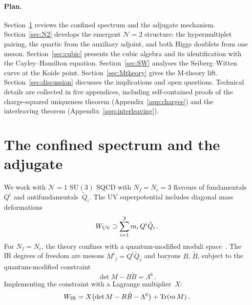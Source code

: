 \documentclass[aps,prd,twocolumn,showpacs,preprintnumbers,superscriptaddress,floatfix]{revtex4-2}
\newcommand{\SU}{\mathrm{SU}}
\newcommand{\Nf}{N_{\!f}}
\newcommand{\Nc}{N_{\!c}}
\newcommand{\Tr}{\mathrm{Tr}}
\begin{document}
\paragraph{Plan.}
Section~\ref{sec:confined} reviews the confined spectrum and the
adjugate mechanism.
Section~\ref{sec:N2} develops the emergent $\mathcal{N}{=}2$
structure: the hypermultiplet pairing, the quartic from the auxiliary
adjoint, and both Higgs doublets from one meson.
Section~\ref{sec:cubic} presents the cubic algebra and its
identification with the Cayley--Hamilton equation.
Section~\ref{sec:SW} analyses the Seiberg--Witten curve at the
Koide point.
Section~\ref{sec:Mtheory} gives the M-theory lift.
Section~\ref{sec:discussion} discusses the implications and open
questions.
Technical details are collected in five appendices, including
self-contained proofs of the charge-squared uniqueness theorem
(Appendix~\ref{app:charges}) and the interleaving theorem
(Appendix~\ref{app:interleaving}).


\section{The confined spectrum and the adjugate}
\label{sec:confined}

We work with $\mathcal{N}{=}1$ $\SU(3)$ SQCD with
$\Nf = \Nc = 3$ flavours of fundamentals~$Q^i$ and
antifundamentals~$\tilde{Q}_i$.
The UV superpotential includes diagonal mass deformations
\begin{equation}
  W_{\rm UV} \supset \sum_{i=1}^{3} m_i\,Q^i\tilde{Q}_i\,.
  \label{eq:WUV}
\end{equation}
For $\Nf = \Nc$, the theory confines with a quantum-modified moduli
space~\cite{Seiberg:1994bz,Csaki:1996zb,IntriligatorSeibergShenker:1995}.
The IR degrees of freedom are mesons $M^i{}_j = Q^i\tilde{Q}_j$ and
baryons $B$, $\tilde{B}$, subject to the quantum-modified constraint
\begin{equation}
  \det M - B\tilde{B} = \Lambda^6\,.
  \label{eq:qmc}
\end{equation}
Implementing the constraint with a Lagrange multiplier~$X$:
\begin{equation}
  W_{\rm IR}
  = X\bigl(\det M - B\tilde{B} - \Lambda^6\bigr)
  + \Tr(m\,M)\,.
  \label{eq:WIR}
\end{equation}
\end{document}
